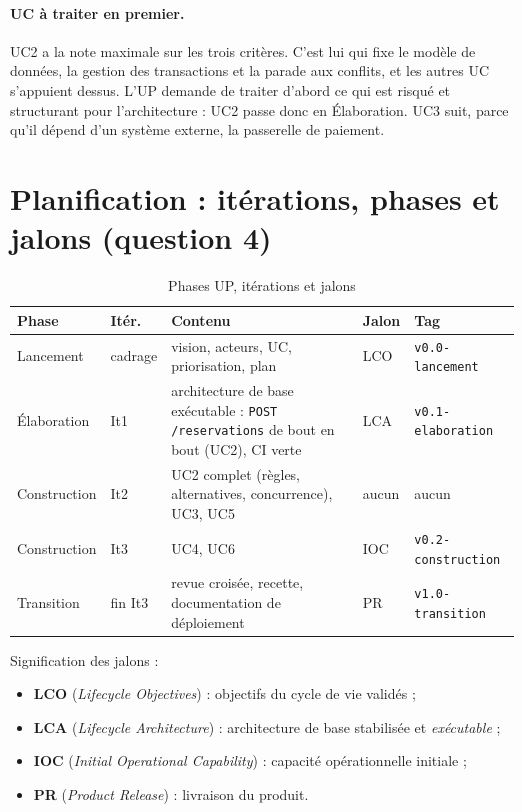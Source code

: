 \documentclass[11pt,a4paper]{article}
\begin{document}
\paragraph{UC à traiter en premier.}
UC2 a la note maximale sur les trois critères. C'est lui qui fixe le modèle de
données, la gestion des transactions et la parade aux conflits, et les autres UC
s'appuient dessus. L'UP demande de traiter d'abord ce qui est risqué et structurant
pour l'architecture : UC2 passe donc en Élaboration. UC3 suit, parce qu'il dépend
d'un système externe, la passerelle de paiement.

\section{Planification : itérations, phases et jalons (question 4)}

\begin{table}[H]
\centering
\begin{tabularx}{\textwidth}{l l L l l}
\toprule
\textbf{Phase} & \textbf{Itér.} & \textbf{Contenu} & \textbf{Jalon} & \textbf{Tag} \\
\midrule
Lancement & cadrage & vision, acteurs, UC, priorisation, plan & LCO & \texttt{v0.0-lancement} \\
Élaboration & It1 & architecture de base exécutable : \texttt{POST /reservations} de bout en bout (UC2), CI verte & LCA & \texttt{v0.1-elaboration} \\
Construction & It2 & UC2 complet (règles, alternatives, concurrence), UC3, UC5 & aucun & aucun \\
Construction & It3 & UC4, UC6 & IOC & \texttt{v0.2-construction} \\
Transition & fin It3 & revue croisée, recette, documentation de déploiement & PR & \texttt{v1.0-transition} \\
\bottomrule
\end{tabularx}
\caption{Phases UP, itérations et jalons}
\end{table}

\noindent Signification des jalons :
\begin{itemize}
  \item \textbf{LCO} (\emph{Lifecycle Objectives}) : objectifs du cycle de vie validés ;
  \item \textbf{LCA} (\emph{Lifecycle Architecture}) : architecture de base stabilisée et \emph{exécutable} ;
  \item \textbf{IOC} (\emph{Initial Operational Capability}) : capacité opérationnelle initiale ;
  \item \textbf{PR} (\emph{Product Release}) : livraison du produit.
\end{itemize}
\end{document}
